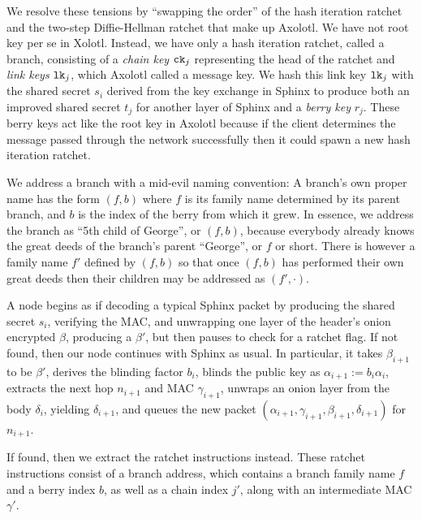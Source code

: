 \documentclass[twoside,letterpaper]{llncs}
\begin{document}
We resolve these tensions by ``swapping the order'' of the hash
iteration ratchet and the two-step Diffie-Hellman ratchet that make
up Axolotl.   
%
We have not root key per se in Xolotl.  
Instead, we have only a hash iteration ratchet, called a branch,
consisting of a {\it chain key} $\texttt{ck}_j$ representing the head of the
ratchet and {\it link keys} $\texttt{lk}_j$, which Axolotl called a message
key.  We hash this link key $\texttt{lk}_j$ with the shared secret $s_i$
derived from the key exchange in Sphinx to produce both an improved
shared secret $t_j$ for another layer of Sphinx and a {\it berry key} $r_j$. 
These berry keys act like the root key in Axolotl because if the
client determines the message passed through the network successfully
then it could spawn a new hash iteration ratchet.

We address a branch with a mid-evil naming convention: 
A branch's own proper name has the form $(f,b)$ where
 $f$ is its family name determined by its parent branch, and
 $b$ is the index of the berry from which it grew.
In essence, we address the branch as ``5th child of George'',
or $(f,b)$, because everybody already knows the great deeds
of the branch's parent ``George'', or $f$ or short. 
There is however a family name $f'$ defined by $(f,b)$ so that
once $(f,b)$ has performed their own great deeds then their
children may be addressed as $(f',\cdot)$.

\smallskip {} 

A node begins as if decoding a typical Sphinx packet by
 producing the shared secret $s_i$, verifying the MAC, and 
 unwrapping one layer of the header's onion encrypted $\beta$,
producing a $\beta'$,
but then pauses to check for a ratchet flag. 
If not found, then our node continues with Sphinx as usual.
In particular, it takes $\beta_{i+1}$ to be $\beta'$,
derives the blinding factor $b_i$,
blinds the public key as $\alpha_{i+1} := b_i \alpha_i$,
extracts the next hop $n_{i+1}$ and MAC $\gamma_{i+1}$,
unwraps an onion layer from the body $\delta_i$,
 yielding $\delta_{i+1}$, and queues the new packet
$(\alpha_{i+1},\gamma_{i+1},\beta_{i+1},\delta_{i+1})$ for $n_{i+1}$.

If found, then we extract the ratchet instructions instead.
These ratchet instructions consist of a branch address,
which contains a branch family name $f$ and a berry index $b$,
 as well as a chain index $j'$,
along with an intermediate MAC $\gamma'$.
\end{document}
